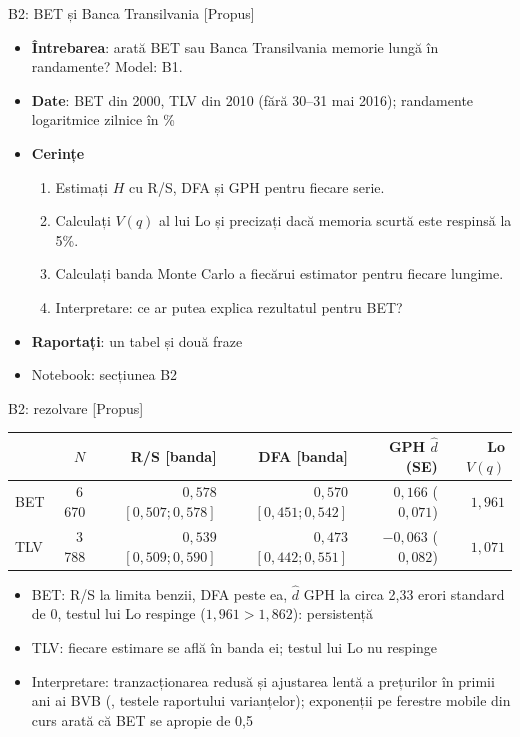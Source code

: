 \begin{frame}{B2: BET și Banca Transilvania [Propus]}
\itemsize{\footnotesize}
\begin{itemize}
\item \textbf{Întrebarea}: arată BET sau Banca Transilvania memorie lungă în randamente? Model: B1.
\item \textbf{Date}: BET din 2000, TLV din 2010 (fără 30--31 mai 2016); randamente logaritmice zilnice în \%
\item \textbf{Cerințe}
\begin{enumerate}
    \item Estimați $H$ cu R/S, DFA și GPH pentru fiecare serie.
    \item Calculați $V(q)$ al lui Lo și precizați dacă memoria scurtă este respinsă la 5\%.
    \item Calculați banda Monte Carlo a fiecărui estimator pentru fiecare lungime.
    \item Interpretare: ce ar putea explica rezultatul pentru BET?
\end{enumerate}
\item \textbf{Raportați}: un tabel și două fraze
\item Notebook: secțiunea B2
\end{itemize}
\end{frame}

\ifsolutions
\begin{frame}{B2: rezolvare [Propus]}
\itemsize{\footnotesize}
\begin{center}
\scriptsize
\begin{tabular}{lrrrrr}
\toprule
 & $N$ & R/S [banda] & DFA [banda] & GPH $\hat d$ (SE) & Lo $V(q)$ \\
\midrule
BET & 6\,670 & $0{,}578$ $[0{,}507; 0{,}578]$ & $0{,}570$ $[0{,}451; 0{,}542]$ & $0{,}166$ ($0{,}071$) & $1{,}961$ \\
TLV & 3\,788 & $0{,}539$ $[0{,}509; 0{,}590]$ & $0{,}473$ $[0{,}442; 0{,}551]$ & $-0{,}063$ ($0{,}082$) & $1{,}071$ \\
\bottomrule
\end{tabular}
\end{center}
\begin{itemize}
    \item BET: R/S la limita benzii, DFA peste ea, $\hat d$ GPH la circa 2{,}33 erori standard de 0, testul lui Lo respinge ($1{,}961 > 1{,}862$): persistență
    \item TLV: fiecare estimare se află în banda ei; testul lui Lo nu respinge
    \item Interpretare: tranzacționarea redusă și ajustarea lentă a prețurilor în primii ani ai BVB (, testele raportului varianțelor); exponenții pe ferestre mobile din curs arată că BET se apropie de 0,5
\end{itemize}
\end{frame}
\fi

